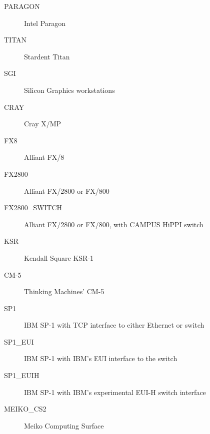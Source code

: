 \begin{ifinfo}
\begin{description}
\item[PARAGON] Intel Paragon

\item[TITAN] Stardent Titan

\item[SGI] Silicon Graphics workstations

\item[CRAY] Cray X/MP

\item[FX8] Alliant FX/8

\item[FX2800] Alliant FX/2800 or FX/800

\item[FX2800_SWITCH] Alliant FX/2800 or FX/800, with CAMPUS HiPPI switch

\item[KSR] Kendall Square KSR-1

\item[CM-5] Thinking Machines' CM-5

\item[SP1] IBM SP-1 with TCP interface to either Ethernet or switch

\item[SP1_EUI] IBM SP-1 with IBM's EUI interface to the switch

\item[SP1_EUIH] IBM SP-1 with IBM's experimental EUI-H switch interface

\item[MEIKO_CS2] Meiko Computing Surface

\end{description}

\end{ifinfo}

